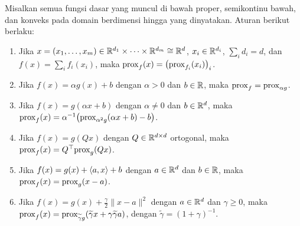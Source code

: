\begin{lemma}
    Misalkan semua fungsi dasar yang muncul di bawah proper, semikontinu bawah, dan konveks pada domain berdimensi hingga yang dinyatakan. Aturan berikut berlaku:
    \begin{enumerate}
        \item Jika \(x=(x_1,\dots,x_m)\in\mathbb{R}^{d_1}\times\cdots\times\mathbb{R}^{d_m}\cong\mathbb{R}^d\), \(x_i\in\mathbb{R}^{d_i}\), \(\sum_i d_i=d\), dan \(f(x)=\sum_i f_i(x_i)\), maka \(\mathrm{prox}_f(x)=\bigl(\mathrm{prox}_{f_i}(x_i)\bigr)_i\).
        \item Jika \(f(x)=\alpha g(x)+b\) dengan \(\alpha>0\) dan \(b\in\mathbb{R}\), maka \(\mathrm{prox}_f=\mathrm{prox}_{\alpha g}\).
        \item Jika \(f(x)=g(\alpha x+b)\) dengan \(\alpha\neq0\) dan \(b\in\mathbb{R}^d\), maka \(\mathrm{prox}_f(x)=\alpha^{-1}\bigl(\mathrm{prox}_{\alpha^2g}(\alpha x+b)-b\bigr)\).
        \item Jika \(f(x)=g(Qx)\) dengan \(Q\in\mathbb{R}^{d\times d}\) ortogonal, maka \(\mathrm{prox}_f(x)=Q^\top\mathrm{prox}_g(Qx)\).
        \item Jika \(f(x)=g(x)+\left\langle a , x\right\rangle+b\) dengan \(a\in\mathbb{R}^d\) dan \(b\in\mathbb{R}\), maka \(\mathrm{prox}_f(x)=\mathrm{prox}_g(x-a)\).
        \item Jika \(f(x)=g(x)+\frac{\gamma}{2}\|x-a\|^2\) dengan \(a\in\mathbb{R}^d\) dan \(\gamma\geq0\), maka \(\mathrm{prox}_f(x)=\mathrm{prox}_{\widetilde\gamma g}(\widetilde\gamma x+\gamma\widetilde\gamma a)\), dengan \(\widetilde\gamma=(1+\gamma)^{-1}\).
    \end{enumerate}
\end{lemma}

